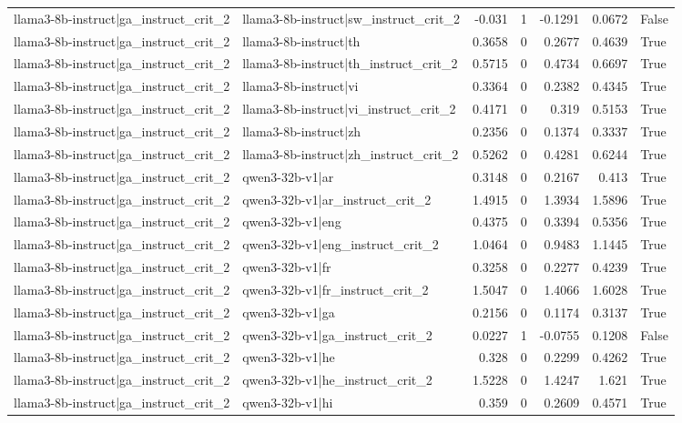 \begin{table}
\begin{tabular}{l l r r r r l}
llama3-8b-instruct|ga_instruct_crit_2 & llama3-8b-instruct|sw_instruct_crit_2 & -0.031 & 1 & -0.1291 & 0.0672 & False \\
llama3-8b-instruct|ga_instruct_crit_2 & llama3-8b-instruct|th & 0.3658 & 0 & 0.2677 & 0.4639 & True \\
llama3-8b-instruct|ga_instruct_crit_2 & llama3-8b-instruct|th_instruct_crit_2 & 0.5715 & 0 & 0.4734 & 0.6697 & True \\
llama3-8b-instruct|ga_instruct_crit_2 & llama3-8b-instruct|vi & 0.3364 & 0 & 0.2382 & 0.4345 & True \\
llama3-8b-instruct|ga_instruct_crit_2 & llama3-8b-instruct|vi_instruct_crit_2 & 0.4171 & 0 & 0.319 & 0.5153 & True \\
llama3-8b-instruct|ga_instruct_crit_2 & llama3-8b-instruct|zh & 0.2356 & 0 & 0.1374 & 0.3337 & True \\
llama3-8b-instruct|ga_instruct_crit_2 & llama3-8b-instruct|zh_instruct_crit_2 & 0.5262 & 0 & 0.4281 & 0.6244 & True \\
llama3-8b-instruct|ga_instruct_crit_2 & qwen3-32b-v1|ar & 0.3148 & 0 & 0.2167 & 0.413 & True \\
llama3-8b-instruct|ga_instruct_crit_2 & qwen3-32b-v1|ar_instruct_crit_2 & 1.4915 & 0 & 1.3934 & 1.5896 & True \\
llama3-8b-instruct|ga_instruct_crit_2 & qwen3-32b-v1|eng & 0.4375 & 0 & 0.3394 & 0.5356 & True \\
llama3-8b-instruct|ga_instruct_crit_2 & qwen3-32b-v1|eng_instruct_crit_2 & 1.0464 & 0 & 0.9483 & 1.1445 & True \\
llama3-8b-instruct|ga_instruct_crit_2 & qwen3-32b-v1|fr & 0.3258 & 0 & 0.2277 & 0.4239 & True \\
llama3-8b-instruct|ga_instruct_crit_2 & qwen3-32b-v1|fr_instruct_crit_2 & 1.5047 & 0 & 1.4066 & 1.6028 & True \\
llama3-8b-instruct|ga_instruct_crit_2 & qwen3-32b-v1|ga & 0.2156 & 0 & 0.1174 & 0.3137 & True \\
llama3-8b-instruct|ga_instruct_crit_2 & qwen3-32b-v1|ga_instruct_crit_2 & 0.0227 & 1 & -0.0755 & 0.1208 & False \\
llama3-8b-instruct|ga_instruct_crit_2 & qwen3-32b-v1|he & 0.328 & 0 & 0.2299 & 0.4262 & True \\
llama3-8b-instruct|ga_instruct_crit_2 & qwen3-32b-v1|he_instruct_crit_2 & 1.5228 & 0 & 1.4247 & 1.621 & True \\
llama3-8b-instruct|ga_instruct_crit_2 & qwen3-32b-v1|hi & 0.359 & 0 & 0.2609 & 0.4571 & True \\

\end{tabular}
\end{table}
